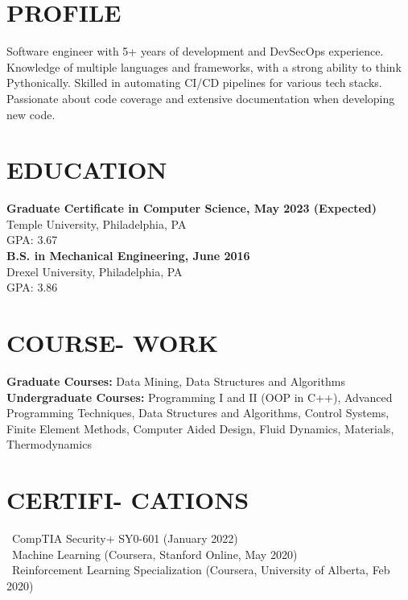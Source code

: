 \documentclass[line,resmargin,11pt]{res}
\begin{document}
\begin{resume}

\section{PROFILE}
Software engineer with 5+ years of development and DevSecOps experience. Knowledge of multiple languages and frameworks, with a strong ability to think Pythonically. 
Skilled in automating CI/CD pipelines for various tech stacks. Passionate about code coverage and extensive documentation when developing new code.
 
\section{EDUCATION}
\textbf{Graduate Certificate in Computer Science, May 2023 (Expected)} \\
Temple University, Philadelphia, PA \\
GPA: 3.67 \\

\textbf{B.S. in Mechanical Engineering, June 2016} \\
Drexel University, Philadelphia, PA \\
GPA: 3.86

\section{COURSE- WORK}
\textbf{Graduate Courses:} Data Mining, Data Structures and Algorithms \\
\textbf{Undergraduate Courses:} Programming I and II (OOP in C++), Advanced Programming Techniques, Data Structures and Algorithms, Control Systems, Finite Element Methods, Computer Aided Design, Fluid Dynamics, Materials, Thermodynamics \\

\section{CERTIFI- CATIONS}
\textbullet\ CompTIA Security+ SY0-601 (January 2022) \\
\textbullet\ Machine Learning (Coursera, Stanford Online, May 2020) \\
\textbullet\ Reinforcement Learning Specialization (Coursera, University of Alberta, Feb 2020)
	

\end{resume}
\end{document}

